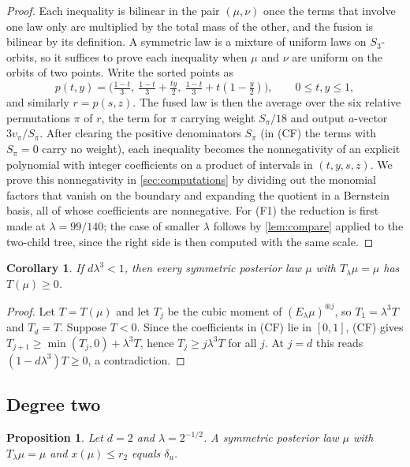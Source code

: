 \documentclass[11pt]{amsart}
\newtheorem{proposition}[theorem]{Proposition}
\newtheorem{corollary}[theorem]{Corollary}
\theoremstyle{definition}
\theoremstyle{remark}
\begin{document}
\begin{proof}
Each inequality is bilinear in the pair $(\mu,\nu)$ once the terms that involve one law only are multiplied by
the total mass of the other, and the fusion is bilinear by its definition. A symmetric law is a mixture of
uniform laws on $S_3$-orbits, so it suffices to prove each inequality when $\mu$ and $\nu$ are uniform on the
orbits of two points. Write the sorted points as
\[
p(t,y)=\big(\tfrac{1-t}3,\ \tfrac{1-t}3+\tfrac{ty}2,\ \tfrac{1-t}3+t(1-\tfrac y2)\big),\qquad 0\le t,y\le1,
\]
and similarly $r=p(s,z)$. The fused law is then the average over the six relative permutations $\pi$ of $r$, the
term for $\pi$ carrying weight $S_\pi/18$ and output $a$-vector $3v_\pi/S_\pi$. After clearing the positive
denominators $S_\pi$ (in (CF) the terms with $S_\pi=0$ carry no weight), each inequality becomes the
nonnegativity of an explicit polynomial with integer coefficients on a product of intervals in $(t,y,s,z)$.
We prove this nonnegativity in \cref{sec:computations} by dividing out the monomial factors that vanish on the
boundary and expanding the quotient in a Bernstein basis, all of whose coefficients are nonnegative. For (F1)
the reduction is first made at $\lambda=99/140$; the case of smaller $\lambda$ follows by \cref{lem:compare}
applied to the two-child tree, since the right side is then computed with the same scale.
\end{proof}

\begin{corollary}\label{cor:sign}
If $d\lambda^3<1$, then every symmetric posterior law $\mu$ with $T_\lambda\mu=\mu$ has $T(\mu)\ge0$.
\end{corollary}

\begin{proof}
Let $T=T(\mu)$ and let $T_j$ be the cubic moment of $(E_\lambda\mu)^{\circledast j}$, so $T_1=\lambda^3T$ and
$T_d=T$. Suppose $T<0$. Since the coefficients in (CF) lie in $[0,1]$, (CF) gives
$T_{j+1}\ge\min(T_j,0)+\lambda^3T$, hence $T_j\ge j\lambda^3T$ for all $j$. At $j=d$ this reads
$(1-d\lambda^3)T\ge0$, a contradiction.
\end{proof}

\subsection{Degree two}

\begin{proposition}\label{prop:local2}
Let $d=2$ and $\lambda=2^{-1/2}$. A symmetric posterior law $\mu$ with $T_\lambda\mu=\mu$ and $x(\mu)\le r_2$
equals $\delta_u$.
\end{proposition}
\end{document}
